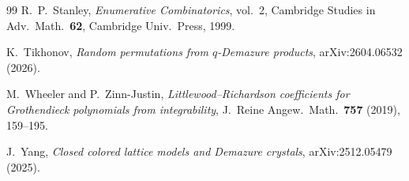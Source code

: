 \documentclass[11pt,a4paper]{article}
\theoremstyle{plain}
\theoremstyle{definition}
\theoremstyle{remark}
\begin{document}
\begin{thebibliography}{99}
R.~P.~Stanley,
\emph{Enumerative Combinatorics}, vol.~2,
Cambridge Studies in Adv.\ Math.\ \textbf{62}, Cambridge Univ.\ Press, 1999.

K.~Tikhonov,
\emph{Random permutations from $q$-Demazure products},
arXiv:2604.06532 (2026).

M.~Wheeler and P.~Zinn-Justin,
\emph{Littlewood--Richardson coefficients for Grothendieck polynomials
from integrability},
J.~Reine Angew.\ Math.\ \textbf{757} (2019), 159--195.

J.~Yang,
\emph{Closed colored lattice models and Demazure crystals},
arXiv:2512.05479 (2025).

\end{thebibliography}
\end{document}
